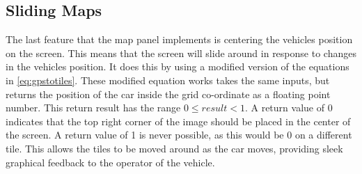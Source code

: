 \subsection{Sliding Maps}

The last feature that the map panel implements is centering the vehicles position on the screen. This means that the screen will slide around in response to changes in the vehicles position. It does this by using a modified version of the equations in \ref{eq:gpstotiles}. These modified equation works takes the same inputs, but returns the position of the car inside the grid co-ordinate as a floating point number. This return result has the range $0 \le result<1$. A return value of 0 indicates that the top right corner of the image should be placed in the center of the screen. A return value of 1 is never possible, as this would be 0 on a different tile. This allows the tiles to be moved around as the car moves, providing sleek graphical feedback to the operator of the vehicle.



